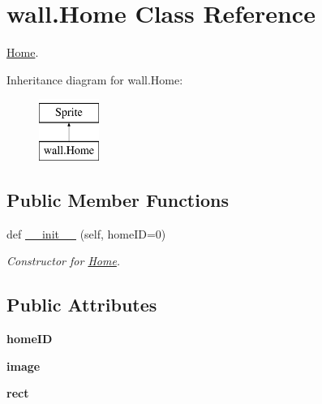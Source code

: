 \hypertarget{classwall_1_1_home}{}\section{wall.\+Home Class Reference}
\label{classwall_1_1_home}


\mbox{\hyperlink{classwall_1_1_home}{Home}}.  


Inheritance diagram for wall.\+Home\+:\begin{figure}[H]
\begin{center}
\leavevmode
\includegraphics[height=2.000000cm]{classwall_1_1_home}
\end{center}
\end{figure}
\subsection*{Public Member Functions}
\begin{DoxyCompactItemize}
\item 
def \mbox{\hyperlink{classwall_1_1_home_aaeaa84fbc29f21ffeebe4301b8a1a1fd}{\+\_\+\+\_\+init\+\_\+\+\_\+}} (self, home\+ID=0)
\begin{DoxyCompactList}\small\item\em Constructor for \mbox{\hyperlink{classwall_1_1_home}{Home}}. \end{DoxyCompactList}\end{DoxyCompactItemize}
\subsection*{Public Attributes}
\begin{DoxyCompactItemize}
\item 
\mbox{\label{classwall_1_1_home_acb90952470bff9994b45f89144ba3daf}} 
{\bfseries home\+ID}
\item 
\mbox{\label{classwall_1_1_home_a7b4807ecc592253ef774addafeafe4c7}} 
{\bfseries image}
\item 
\mbox{\label{classwall_1_1_home_a0402195a15217fd6a960859bd6242663}} 
{\bfseries rect}
\end{DoxyCompactItemize}


